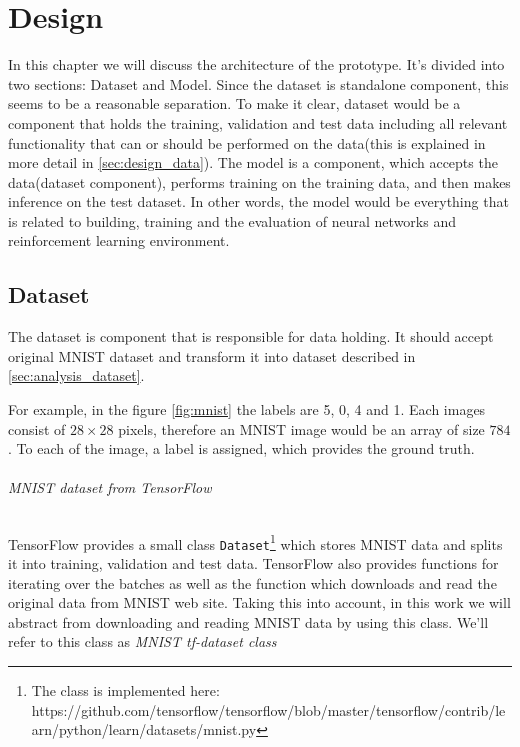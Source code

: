 \chapter{Design}
\label{ch:design}
In this chapter we will discuss the architecture of the prototype.
It's divided into two sections: Dataset and Model. Since
the dataset is standalone component, this seems to be
a reasonable separation. To make it clear, dataset would be a component
that holds the training, validation and test data including all relevant
functionality that can or should be performed on the
data(this is explained in more detail in \autoref{sec:design_data}).
The model is a component, which accepts the data(dataset component), performs
training on the training data, and then makes inference on the test dataset.
In other words, the model would be everything that is related to building,
training and the evaluation of neural networks and reinforcement learning environment.



\section{Dataset}
\label{sec:design_data}

The dataset is component that is responsible for data holding. It should
accept original MNIST dataset and transform it into dataset described
in \autoref{sec:analysis_dataset}.

For example, in the figure \ref{fig:mnist} the labels are 5, 0, 4 and 1.
Each images consist of $28\times28$ pixels, therefore an MNIST image would
be an array of size $784$. To each of the image, a label is assigned,
which provides the ground truth.

\subparagraph{MNIST dataset from TensorFlow}

TensorFlow provides a small class \lstinline{Dataset}\footnote{
The class is implemented here: https://github.com/tensorflow/tensorflow/blob/master/tensorflow/contrib/learn/python/learn/datasets/mnist.py
} which stores MNIST data and splits it into training,
validation and test data. TensorFlow also provides functions for iterating
over the batches as well as the function which downloads and read
the original data
from MNIST web site. Taking this into account, in this work we will abstract from
downloading and reading MNIST data by using this class. We'll refer
to this class as \emph{MNIST tf-dataset class}


